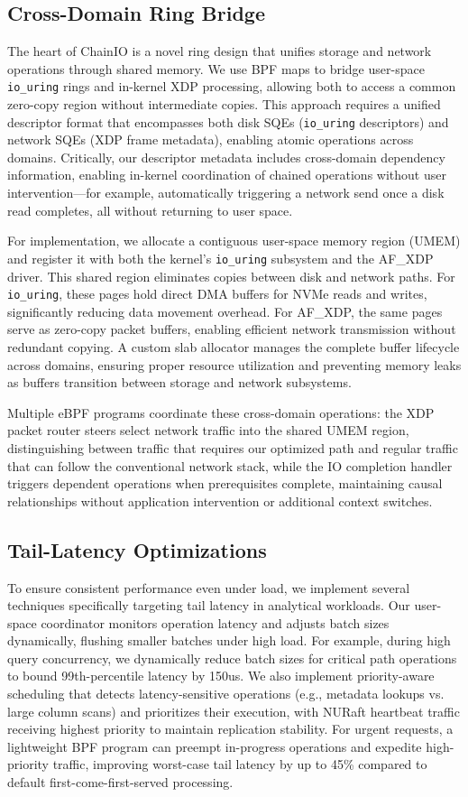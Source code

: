 \documentclass[sigconf,10pt]{acmart}
\newcommand{\sys}{ChainIO\xspace}
\begin{document}
\subsection{Cross-Domain Ring Bridge}
The heart of \sys is a novel ring design that unifies storage and network operations through shared memory. We use BPF maps to bridge user-space \texttt{io\_uring} rings and in-kernel XDP processing, allowing both to access a common zero-copy region without intermediate copies. This approach requires a unified descriptor format that encompasses both disk SQEs (\texttt{io\_uring} descriptors) and network SQEs (XDP frame metadata), enabling atomic operations across domains. Critically, our descriptor metadata includes cross-domain dependency information, enabling in-kernel coordination of chained operations without user intervention—for example, automatically triggering a network send once a disk read completes, all without returning to user space.

For implementation, we allocate a contiguous user-space memory region (UMEM) and register it with both the kernel's \texttt{io\_uring} subsystem and the AF\_XDP driver. This shared region eliminates copies between disk and network paths. For \texttt{io\_uring}, these pages hold direct DMA buffers for NVMe reads and writes, significantly reducing data movement overhead. For AF\_XDP, the same pages serve as zero-copy packet buffers, enabling efficient network transmission without redundant copying. A custom slab allocator manages the complete buffer lifecycle across domains, ensuring proper resource utilization and preventing memory leaks as buffers transition between storage and network subsystems.

Multiple eBPF programs coordinate these cross-domain operations: the XDP packet router steers select network traffic into the shared UMEM region, distinguishing between traffic that requires our optimized path and regular traffic that can follow the conventional network stack, while the IO completion handler triggers dependent operations when prerequisites complete, maintaining causal relationships without application intervention or additional context switches.

\subsection{Tail-Latency Optimizations}
To ensure consistent performance even under load, we implement several techniques specifically targeting tail latency in analytical workloads. Our user-space coordinator monitors operation latency and adjusts batch sizes dynamically, flushing smaller batches under high load. For example, during high query concurrency, we dynamically reduce batch sizes for critical path operations to bound 99th-percentile latency by 150us. We also implement priority-aware scheduling that detects latency-sensitive operations (e.g., metadata lookups vs. large column scans) and prioritizes their execution, with NURaft heartbeat traffic receiving highest priority to maintain replication stability. For urgent requests, a lightweight BPF program can preempt in-progress operations and expedite high-priority traffic, improving worst-case tail latency by up to 45\% compared to default first-come-first-served processing.
\end{document}
